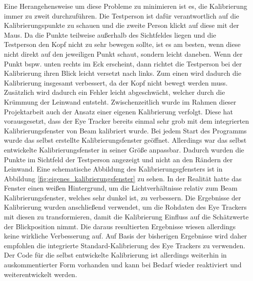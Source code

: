 Eine Herangehensweise um diese Probleme zu minimieren ist es, die Kalibrierung immer zu zweit durchzuführen. Die Testperson ist dafür verantwortlich auf die Kalibrierungspunkte zu schauen und die zweite Person klickt auf diese mit der Maus. Da die Punkte teilweise außerhalb des Sichtfeldes liegen und die Testperson den Kopf nicht zu sehr bewegen sollte, ist es am besten, wenn diese nicht direkt auf den jeweiligen Punkt schaut, sondern leicht daneben. Wenn der Punkt bspw. unten rechts im Eck erscheint, dann richtet die Testperson bei der Kalibrierung ihren Blick leicht versetzt nach links. Zum einen wird dadurch die Kalibrierung insgesamt verbessert, da der Kopf nicht bewegt werden muss. Zusätzlich wird dadurch ein Fehler leicht abgeschwächt, welcher durch die Krümmung der Leinwand entsteht.
Zwischenzeitlich wurde im Rahmen dieser Projektarbeit auch der Ansatz einer eigenen Kalibrierung verfolgt. Diese hat vorausgesetzt, dass der Eye Tracker bereits einmal sehr grob mit dem integrierten Kalibrierungsfenster von Beam kalibriert wurde. Bei jedem Start des Programms wurde das selbst erstellte Kalibrierungsfenster geöffnet. Allerdings war das selbst entwickelte Kalibrierungsfenster in seiner Größe anpassbar. Dadurch wurden die Punkte im Sichtfeld der Testperson angezeigt und nicht an den Rändern der Leinwand. Eine schematische Abbildung des Kalibrierungsgfensters ist in Abbildung \ref{fig:eigenes_kalibrierungsfenster} zu sehen. In der Realität hatte das Fenster einen weißen Hintergrund, um die Lichtverhältnisse relativ zum Beam Kalibrierungsfenster, welches sehr dunkel ist, zu verbessern. Die Ergebnisse der Kalibrierung wurden anschließend verwendet, um die Rohdaten des Eye Trackers mit diesen zu transformieren, damit die Kalibrierung Einfluss auf die Schätzwerte der Blickposition nimmt. Die daraus resultierten Ergebnisse wiesen allerdings keine wirkliche Verbesserung auf. Auf Basis der bisherigen Ergebnisse wird daher empfohlen die integrierte Standard-Kalibrierung des Eye Trackers zu verwenden. Der Code für die selbst entwickelte Kalibrierung ist allerdings weiterhin in auskommentierter Form vorhanden und kann bei Bedarf wieder reaktiviert und weiterentwickelt werden. 

